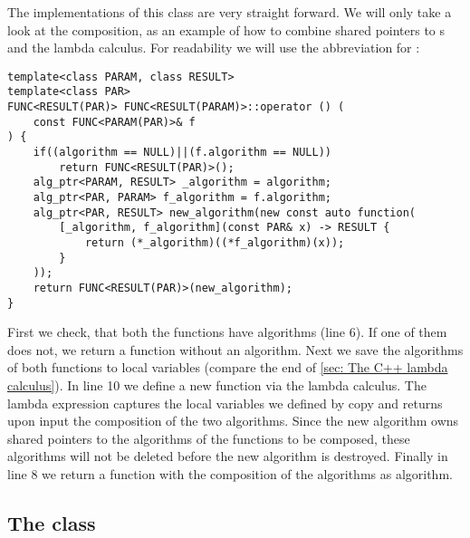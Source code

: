 The implementations of this class are very straight forward. We will only take a look at the composition, as an example of how to combine shared pointers to s and the \cc lambda calculus. For readability we will use the abbreviation  for :
\begin{lstlisting}
template<class PARAM, class RESULT>
template<class PAR>
FUNC<RESULT(PAR)> FUNC<RESULT(PARAM)>::operator () (
	const FUNC<PARAM(PAR)>& f
) {
	if((algorithm == NULL)||(f.algorithm == NULL))
		return FUNC<RESULT(PAR)>();
	alg_ptr<PARAM, RESULT> _algorithm = algorithm;
	alg_ptr<PAR, PARAM> f_algorithm = f.algorithm;
	alg_ptr<PAR, RESULT> new_algorithm(new const auto function(
		[_algorithm, f_algorithm](const PAR& x) -> RESULT {
			return (*_algorithm)((*f_algorithm)(x));
		}
	));
	return FUNC<RESULT(PAR)>(new_algorithm);
}
\end{lstlisting}
First we check, that both the functions have algorithms (line 6). If one of them does not, we return a function without an algorithm. Next we save the algorithms of both functions to local variables (compare the end of \cref{sec: The C++ lambda calculus}). In line 10 we define a new function via the \cc lambda calculus. The lambda expression captures the local variables we defined by copy and returns upon input the composition of the two algorithms. Since the new algorithm owns shared pointers to the algorithms of the functions to be composed, these algorithms will not be deleted before the new algorithm is destroyed. Finally in line 8 we return a function with the composition of the algorithms as algorithm.


\subsection{The class }

